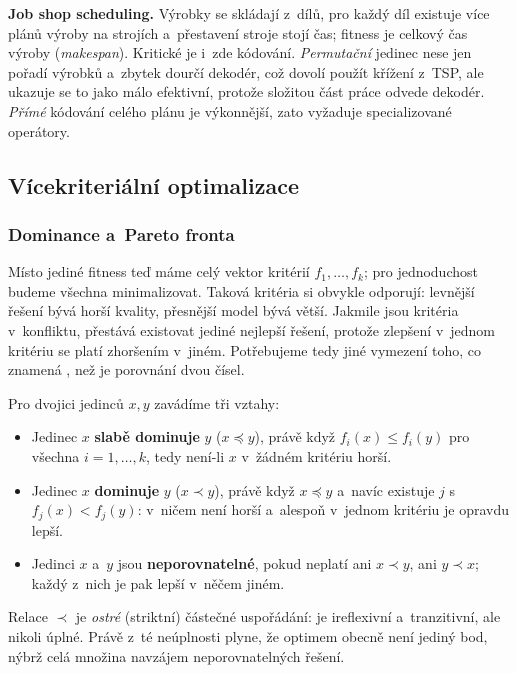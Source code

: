 \documentclass[11pt,a4paper]{article}
\theoremstyle{definition}
\begin{document}
\textbf{Job shop scheduling.} Výrobky se skládají z~dílů, pro každý díl existuje více plánů
výroby na strojích a~přestavení stroje stojí čas; fitness je celkový čas výroby
(\emph{makespan}). Kritické je i~zde kódování. \emph{Permutační} jedinec nese jen pořadí
výrobků a~zbytek dourčí dekodér, což dovolí použít křížení z~TSP, ale ukazuje se to jako
málo efektivní, protože složitou část práce odvede dekodér. \emph{Přímé} kódování celého
plánu je výkonnější, zato vyžaduje specializované operátory.

\subsection{Vícekriteriální optimalizace}
\label{sec:moea}

\subsubsection{Dominance a~Pareto fronta}

Místo jediné fitness teď máme celý vektor kritérií $f_1,\dots,f_k$; pro jednoduchost
budeme všechna minimalizovat. Taková kritéria si obvykle odporují: levnější řešení bývá
horší kvality, přesnější model bývá větší. Jakmile jsou kritéria v~konfliktu, přestává
existovat jediné nejlepší řešení, protože zlepšení v~jednom kritériu se platí zhoršením
v~jiném. Potřebujeme tedy jiné vymezení toho, co znamená , než je porovnání
dvou čísel.

\begin{defbox}[Dominance]
Pro dvojici jedinců $x, y$ zavádíme tři vztahy:
\begin{itemize}
\item Jedinec $x$ \textbf{slabě dominuje} $y$ ($x \preceq y$), právě když
  $f_i(x) \le f_i(y)$ pro všechna $i = 1,\dots,k$, tedy není-li $x$ v~žádném
  kritériu horší.
\item Jedinec $x$ \textbf{dominuje} $y$ ($x \prec y$), právě když $x \preceq y$
  a~navíc existuje $j$ s~$f_j(x) < f_j(y)$: v~ničem není horší a~alespoň v~jednom
  kritériu je opravdu lepší.
\item Jedinci $x$ a~$y$ jsou \textbf{neporovnatelné}, pokud neplatí ani $x \prec y$,
  ani $y \prec x$; každý z~nich je pak lepší v~něčem jiném.
\end{itemize}
Relace $\prec$ je \emph{ostré} (striktní) částečné uspořádání: je ireflexivní
a~tranzitivní, ale nikoli úplné. Právě z~té neúplnosti plyne, že optimem obecně není
jediný bod, nýbrž celá množina navzájem neporovnatelných řešení.
\end{defbox}
\end{document}
